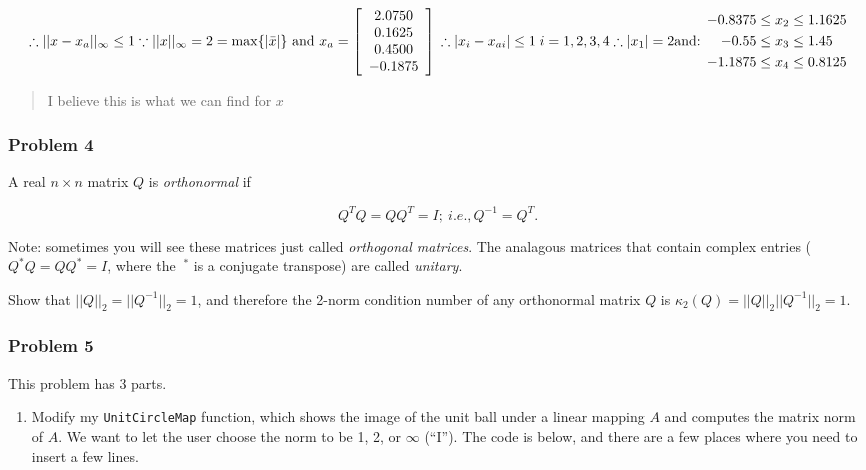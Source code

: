 \documentclass[]{article}
\providecommand{\tightlist}{%
  \setlength{\itemsep}{0pt}\setlength{\parskip}{0pt}}
\begin{document}
\[
\therefore ||x-x_{a}||_{\infty} \leq 1\\
\because ||x||_{\infty} = 2 = \max\{|\bar{x}|\} \text{ and } x_{a}=\left[\begin{array}{c}2.0750 \\ 0.1625 \\ 0.4500 \\ -0.1875 \end{array}\right]\\
\therefore |x_{i}-x_{ai}|\leq 1 \; i=1,2,3,4 \\
\therefore |x_{1}|=2\\
\text{and:  } 
\begin{aligned}-0.8375 & \leq x_{2} \leq 1.1625 \\-0.55 & \leq x_{3} \leq 1.45 \\-1.1875 & \leq x_{4} \leq 0.8125 \end{aligned}
\]

\begin{quote}
I believe this is what we can find for \(x\)
\end{quote}

\hypertarget{problem-4}{%
\subsubsection{Problem 4}\label{problem-4}}

A real \(n \times n\) matrix \(Q\) is \emph{orthonormal} if

\[ Q^{T}Q=QQ^T=I;~i.e., Q^{-1}=Q^T.\]

Note: sometimes you will see these matrices just called \emph{orthogonal
matrices}. The analagous matrices that contain complex entries
(\(Q^*Q=QQ^*=I\), where the \(~^*\) is a conjugate transpose) are called
\emph{unitary}.

Show that \(||Q||_2=||Q^{-1}||_2=1\), and therefore the 2-norm condition
number of any orthonormal matrix \(Q\) is
\(\kappa_2(Q)=||Q||_2 ||Q^{-1}||_2=1\).

\hypertarget{problem-5}{%
\subsubsection{Problem 5}\label{problem-5}}

This problem has 3 parts.

\begin{enumerate}
\def\labelenumi{(\alph{enumi})}
\tightlist
\item
  Modify my \texttt{UnitCircleMap} function, which shows the image of
  the unit ball under a linear mapping \(A\) and computes the matrix
  norm of \(A\). We want to let the user choose the norm to be 1, 2, or
  \(\infty\) (``I''). The code is below, and there are a few places
  where you need to insert a few lines.
\end{enumerate}
\end{document}
